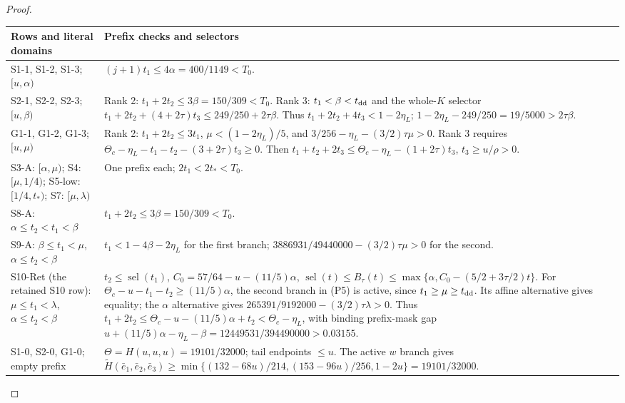 \begin{proof}
\begin{longtable}{@{}p{}p{}@{}}
\toprule
Rows and literal domains & Prefix checks and selectors \\
\midrule\endhead
S1-1, S1-2, S1-3; $[u,\alpha)$
& $(j+1)t_1\le4\alpha=400/1149<T_0$. \\[3pt]
S2-1, S2-2, S2-3; $[u,\beta)$
& Rank 2: $t_1+2t_2\le3\beta=150/309<T_0$.
Rank 3: $t_1<\beta<t_{\rm dd}$ and the whole-$K$ selector
$t_1+2t_2+(4+2\tau)t_3\le249/250+2\tau\beta$.
Thus $t_1+2t_2+4t_3<1-2\eta_L$;
$1-2\eta_L-249/250=19/5000>2\tau\beta$. \\[3pt]
G1-1, G1-2, G1-3; $[u,\mu)$
& Rank 2: $t_1+2t_2\le3t_1$,
$\mu<(1-2\eta_L)/5$, and
$3/256-\eta_L-(3/2)\tau\mu>0$.
Rank 3 requires $\Theta_c-\eta_L-t_1-t_2-(3+2\tau)t_3\ge0$.
Then $t_1+t_2+2t_3\le\Theta_c-\eta_L-(1+2\tau)t_3$,
$t_3\ge u/\rho>0$. \\[3pt]
S3-A: $[\alpha,\mu)$;
S4: $[\mu,1/4)$;
S5-low: $[1/4,t_*)$;
S7: $[\mu,\lambda)$
& One prefix each; $2t_1<2t_*<T_0$. \\[3pt]
S8-A: $\alpha\le t_2<t_1<\beta$
& $t_1+2t_2\le3\beta=150/309<T_0$. \\[3pt]
S9-A: $\beta\le t_1<\mu$, $\alpha\le t_2<\beta$
& $t_1<1-4\beta-2\eta_L$ for the first branch;
$3886931/49440000-(3/2)\tau\mu>0$ for the second. \\[3pt]
S10-Ret (the retained S10 row): $\mu\le t_1<\lambda$, $\alpha\le t_2<\beta$
& $t_2\le\operatorname{sel}(t_1)$,
$C_0=57/64-u-(11/5)\alpha$,
$\operatorname{sel}(t)\le B_\tau(t)\le\max\{\alpha,C_0-(5/2+3\tau/2)t\}$.
For $\Theta_c-u-t_1-t_2\ge(11/5)\alpha$,
the second branch in (P5) is active, since $t_1\ge\mu\ge t_{\rm dd}$.
Its affine alternative gives equality;
the $\alpha$ alternative gives $265391/9192000-(3/2)\tau\lambda>0$.
Thus $t_1+2t_2\le\Theta_c-u-(11/5)\alpha+t_2<\Theta_c-\eta_L$,
with binding prefix-mask gap
$u+(11/5)\alpha-\eta_L-\beta=12449531/394490000>0.03155$. \\[3pt]
S1-0, S2-0, G1-0; empty prefix
& $\Theta=H(u,u,u)=19101/32000$; tail endpoints $\le u$.
The active $w$ branch gives
$\widetilde H(\bar e_1,\bar e_2,\bar e_3)\ge
\min\{(132-68u)/214,(153-96u)/256,1-2u\}=19101/32000$. \\
\bottomrule
\end{longtable}


\end{proof}
